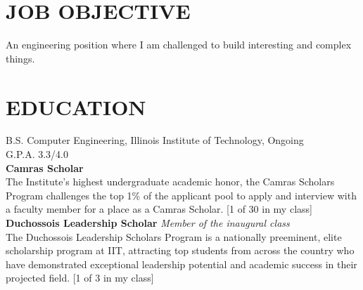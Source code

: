 \documentclass{res}
\begin{document}
 

\address{\bf  PRESENT ADDRESS\\Box 2032 \\3201 S. State St.\\Chicago, IL 60616\\(630).450.5725}
\address{\bf PERMANENT ADDRESS \\2558 Breckeridge Ct.\\Aurora, IL 60504 \\  (630).978.1952}
                                  
\begin{resume}

\section{JOB OBJECTIVE}          
    An engineering position where I am challenged to build interesting and complex things.
 
\section{EDUCATION}          
    B.S. Computer Engineering, Illinois Institute of Technology, Ongoing\\
    G.P.A. 3.3/4.0\\
   {\bf Camras Scholar}\\
        The Institute's highest undergraduate academic honor, the Camras Scholars Program challenges the top 1\% of the applicant pool to apply and interview with a faculty member for a place as a Camras Scholar. [1 of 30 in my class]\\
    {\bf Duchossois Leadership Scholar} \emph{Member of the inaugural class}\\
  The Duchossois Leadership Scholars Program is a nationally preeminent, elite scholarship program at IIT, attracting top students from across the country who have demonstrated exceptional leadership potential and academic success in their projected field. [1 of 3 in my class]
 

\end{resume}
\end{document}
